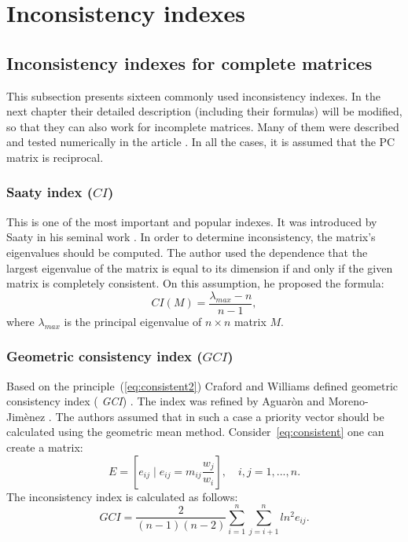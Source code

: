 \chapter{Inconsistency indexes}
\label{sec:inconsistencyIndexes}
\section{Inconsistency indexes for complete matrices}

This subsection presents sixteen commonly used inconsistency indexes. In the next chapter their detailed description (including their formulas) will be modified, so that they can also work for incomplete matrices. Many of them were described and tested numerically in the article \cite{Brunelli2013}. In all the cases, it is assumed that the PC matrix is reciprocal.


 \subsection{Saaty index ($\textit{CI}$)}

This is one of the most important and popular indexes. It was introduced by Saaty in his seminal work \cite{SAATY1977}. In order to determine inconsistency, the matrix's eigenvalues should be computed. The author used the dependence that the largest eigenvalue of the matrix is equal to its dimension if and only if the given matrix is completely consistent. On this assumption, he proposed the formula:
	\begin{equation} 
		CI(M)=\frac{\lambda_{max}-n}{n-1},
	 \end{equation}
 where $\lambda_{max}$
  is the principal eigenvalue of $n\times n$ matrix $M$.


\subsection{Geometric consistency index ($\textit{GCI}$)}

Based on the principle~(\ref{eq:consistent2}) Craford and Williams defined geometric consistency index (	\textit{GCI}) \cite{CRAWFORD1985}. The index was refined by Aguaròn and Moreno-Jimènez \cite{AGUARON2003}. The authors assumed that in such a case a priority vector should be calculated using the geometric mean method.  Consider~\ref{eq:consistent} one can create a matrix:
	\begin{equation} 
		E=\left[e_{ij}\mid e_{ij}=m_{ij}\frac{w_{j}}{w_{i}}\right],\,\,\,\,\,\,i,j=1,...,n.
	 \end{equation}
 The inconsistency index is calculated as follows:
	 \begin{equation} 
		\label{eq:GCI}
		\textit{GCI}=\frac{2}{(n-1)(n-2)}\sum_{i=1}^{n}\sum_{j=i+1}^{n}ln^{2}e_{ij}.
	 \end{equation}

